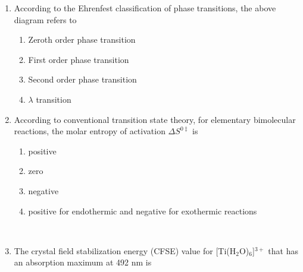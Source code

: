 \documentclass[journal,12pt,onecolumn]{IEEEtran}
\theoremstyle{remark}
\begin{document}
\begin{enumerate}
\item    \hspace{0.5cm}  \hfill{}

\begin{center}
\end{center}

According to the Ehrenfest classification of phase transitions, the above diagram refers to

\begin{multicols}{2}
\begin{enumerate}
    \item Zeroth order phase transition
    \item First order phase transition
    \item Second order phase transition
    \item $\lambda$ transition
\end{enumerate}
\end{multicols}
 

\item    \hspace{0.5cm} According to conventional transition state theory, for elementary bimolecular reactions, the molar entropy of activation $\Delta S^{0\ddagger}$ is  \hfill{}

\begin{multicols}{2}
\begin{enumerate}
    \item positive
    \item zero
    \item negative
    \item positive for endothermic and negative for exothermic reactions
\end{enumerate}
\end{multicols}

\newpage
\

\item    \hspace{0.5cm} The crystal field stabilization energy (CFSE) value for [Ti(H$_2$O)$_6$]$^{3+}$ that has an absorption maximum at 492 nm is  \hfill{}


\end{enumerate}
\end{document}
